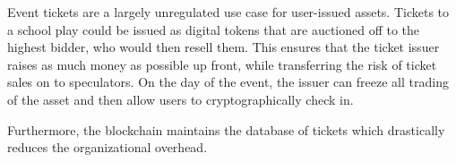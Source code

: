 Event tickets are a largely unregulated use case for user-issued assets.
Tickets to a school play could be issued as digital tokens that are auctioned
off to the highest bidder, who would then resell them. This ensures that the
ticket issuer raises as much money as possible up front, while transferring the
risk of ticket sales on to speculators. On the day of the event, the issuer
can freeze all trading of the asset and then allow users to cryptographically
check in.

Furthermore, the blockchain maintains the database of tickets which drastically
reduces the organizational overhead.

